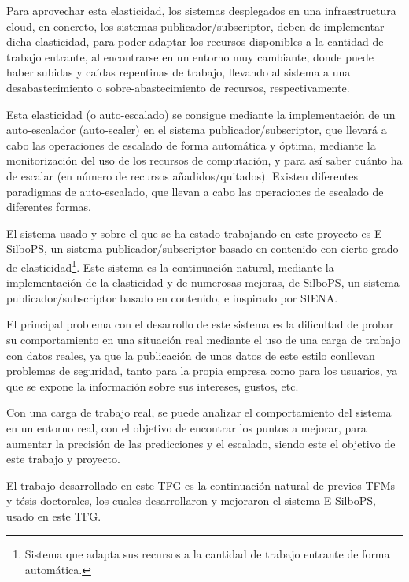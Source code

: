 Para aprovechar esta elasticidad, los sistemas desplegados en una infraestructura 
cloud, en concreto, los sistemas publicador/subscriptor, deben de implementar 
dicha elasticidad, para poder adaptar los recursos disponibles a la cantidad 
de trabajo entrante, al encontrarse en un entorno muy cambiante, donde
puede haber  subidas y caídas repentinas de trabajo, llevando al sistema a una 
desabastecimiento o sobre-abastecimiento de recursos, respectivamente.

Esta elasticidad (o auto-escalado) se consigue mediante la implementación de un 
auto-escalador (auto-scaler) en el sistema publicador/subscriptor, que 
llevará a cabo las operaciones de escalado de forma automática y óptima, mediante
la monitorización del uso de los recursos de computación, y para así saber cuánto ha 
de escalar (en número de recursos añadidos/quitados).
Existen diferentes paradigmas de auto-escalado, que llevan a cabo las operaciones 
de escalado de diferentes formas.

El sistema usado y sobre el que se ha estado trabajando en este proyecto es 
E-SilboPS\cite{tfm:victor2017}\cite{thesis:tesisVictor}\cite{thesis:tesisSVavassori}, 
un sistema publicador/subscriptor basado en contenido con cierto grado de 
elasticidad\footnote{Sistema que adapta sus recursos a la cantidad 
de trabajo entrante de forma automática.}. Este sistema es la continuación natural,
mediante la implementación de la elasticidad y de numerosas mejoras, de 
SilboPS\cite{thesis:tesisSVavassori}, un sistema publicador/subscriptor
basado en contenido, e inspirado por SIENA\cite{paper:siena}.

El principal problema con el desarrollo de este sistema es la dificultad de 
probar su comportamiento en una situación real mediante el uso de una carga de 
trabajo con datos reales, ya que la publicación de unos datos de este estilo 
conllevan problemas de seguridad, tanto para la propia empresa como para
los usuarios, ya que se expone la información sobre sus intereses, gustos, etc.

Con una carga de trabajo real, se puede analizar el comportamiento del sistema 
en un entorno real, con el objetivo de encontrar los puntos a mejorar, para 
aumentar la precisión de las predicciones y el escalado, siendo este el objetivo
de este trabajo y proyecto.

El trabajo desarrollado en este TFG es la continuación natural de previos TFMs y tésis 
doctorales\cite{tfm:victor2017}\cite{thesis:tesisVictor}\cite{thesis:tesisSVavassori}, 
los cuales desarrollaron y mejoraron el sistema E-SilboPS, usado en este TFG.

